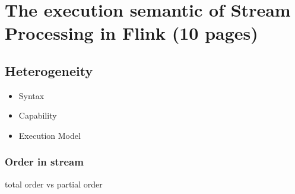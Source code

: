 
\chapter{The execution semantic of Stream Processing in Flink (10 pages)}

\ifpdf
    \graphicspath{{Chapter3/Figs/Raster/}{Chapter3/Figs/PDF/}{Chapter3/Figs/}}
\else
    \graphicspath{{Chapter3/Figs/Vector/}{Chapter3/Figs/}}
\fi

\section{Heterogeneity}\citep{Dindar:2013}
\begin{itemize}
	\item Syntax
	\item Capability
	\item Execution Model
\end{itemize}

 
\subsection*{Order in stream}
total order vs partial order





